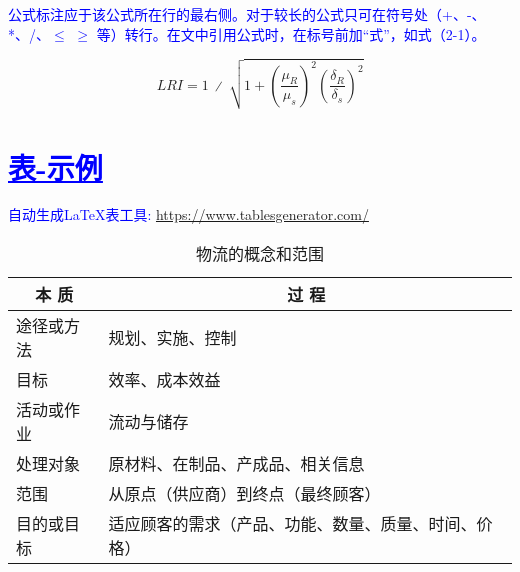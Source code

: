 \textcolor{blue}{公式标注应于该公式所在行的最右侧。对于较长的公式只可在符号处（+、-、*、/、$\leqslant$ $\geqslant$ 等）转行。在文中引用公式时，在标号前加“式”，如式（2-1）。}


\begin{equation}
	LRI=1\ ∕\ \sqrt{ 1 + {\left(\frac{{\mu}_{R}}{{\mu}_{s}}\right)^{2}}{\left(\frac{{\delta}_{R}}{{\delta}_{s}}\right)^{2}} }
\end{equation}

\section{\textcolor{blue}{\underline{\underline{表-示例}}}}

\textcolor{blue}{{自动生成LaTeX表工具: \url{https://www.tablesgenerator.com/}}}

\begin{table}[htbp]
	\linespread{1.5}
	\songti
	\centering
	\caption{物流的概念和范围}\label{物流的概念和范围}
	\begin{tabular}{|l|l|}
		\hline
		\multicolumn{1}{|c|}{本 质} & \multicolumn{1}{c|}{过  程}  \\ \hline
		途径或方法                     & 规划、实施、控制                   \\ \hline
		目标                        & 效率、成本效益                    \\ \hline
		活动或作业                     & 流动与储存                      \\ \hline
		处理对象                      & 原材料、在制品、产成品、相关信息           \\ \hline
		范围                        & 从原点（供应商）到终点（最终顾客）          \\ \hline
		目的或目标                     & 适应顾客的需求（产品、功能、数量、质量、时间、价格） \\ \hline
	\end{tabular}
\end{table}


